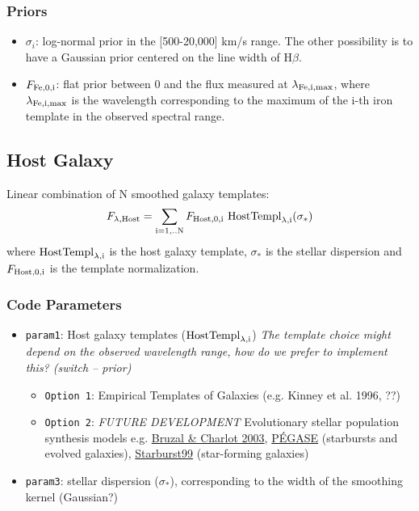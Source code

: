 \documentclass[12pt,letterpaper]{article}
\newcommand{\Hbeta}{\ifmmode {\rm H}\beta \else H$\beta$\fi}
\begin{document}
\subsubsection*{Priors}
\begin{itemize}
    \item {\tt $\sigma_i$}: log-normal prior in the [500-20,000] km/s range. The other possibility is to have a Gaussian prior centered on the line width of \Hbeta.
    \item {\tt $F_{\rm Fe,0,i}$}: flat prior between 0 and the flux measured at $\lambda_{\rm Fe,i,max}$, where $\lambda_{\rm Fe,i,max}$ is the wavelength 
      corresponding to the maximum of the i-th iron template in the observed spectral range.
\end{itemize}

\subsection*{Host Galaxy}
Linear combination of N smoothed galaxy templates:
\begin{equation}
F_{\lambda {\rm{,Host}}} = \sum_{\rm i=1,..N} F_{\rm{Host,0,i}} \  {\rm HostTempl}_{\rm{\lambda,i}}(\sigma_*) 
\end{equation}
where ${\rm HostTempl}_{\rm{\lambda,i}}$ is the host galaxy template, $\sigma_*$ is the stellar dispersion and$F_{\rm Host,0,i}$ is the template normalization.\\

\subsubsection*{Code Parameters}
\begin{itemize}
    \item {\tt param1}: Host galaxy templates (${\rm HostTempl}_{\rm{\lambda,i}}$) \textit{The template choice might depend on the observed wavelength range, how do we 
    prefer to implement this? (switch -- prior)}
    \begin{itemize}
       \item {\tt Option 1}: Empirical Templates of Galaxies (e.g. Kinney et al. 1996, ??)
       \item {\tt Option 2}: \textit{FUTURE DEVELOPMENT} Evolutionary stellar population synthesis models e.g. \href{http://www2.iap.fr/users/charlot/bc2003/}{Bruzal \& Charlot 2003}, 
	\href{http://adsabs.harvard.edu/abs/1997A&A...326..950F} {P\'{E}GASE} (starbursts and evolved galaxies), 
	\href{http://www.stsci.edu/science/starburst99/docs/default.htm}{Starburst99} (star-forming galaxies)    
    \end{itemize}
    \item {\tt param3}: stellar dispersion ($\sigma_*$), corresponding to the width of the smoothing kernel (Gaussian?)
\end{itemize}
\end{document}
